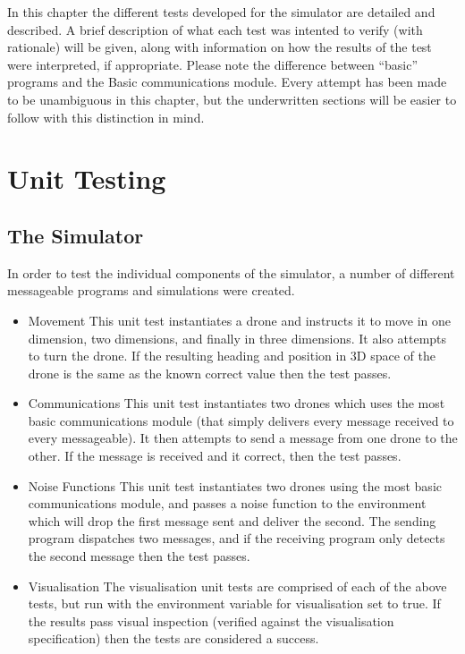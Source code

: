 In this chapter the different tests developed for the simulator are detailed and described. A brief description of what each test was intented to verify (with rationale) will be given, along with information on how the results of the test were interpreted, if appropriate. Please note the difference between ``basic'' programs and the Basic communications module. Every attempt has been made to be unambiguous in this chapter, but the underwritten sections will be easier to follow with this distinction in mind.

\section{Unit Testing}

\subsection{The Simulator}
In order to test the individual components of the simulator, a number of different messageable programs and simulations were created.

\begin{itemize}
\item Movement
This unit test instantiates a drone and instructs it to move in one dimension, two dimensions, and finally in three dimensions. It also attempts to turn the drone. If the resulting heading and position in 3D space of the drone is the same as the known correct value then the test passes.

\item Communications
This unit test instantiates two drones which uses the most basic communications module (that simply delivers every message received to every messageable). It then attempts to send a message from one drone to the other. If the message is received and it correct, then the test passes.

\item Noise Functions
This unit test instantiates two drones using the most basic communications module, and passes a noise function to the environment which will drop the first message sent and deliver the second. The sending program dispatches two messages, and if the receiving program only detects the second message then the test passes.

\item Visualisation
The visualisation unit tests are comprised of each of the above tests, but run with the environment variable for visualisation set to true. If the results pass visual inspection (verified against the visualisation specification) then the tests are considered a success.
\end{itemize}


